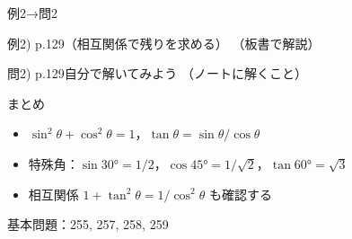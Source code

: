 \documentclass[aspectratio=43,professionalfonts,handout]{beamer}
\begin{document}
\begin{frame}{例2→問2}
  \begin{exampleblock}{例2) p.129（相互関係で残りを求める）}
    （板書で解説）
  \end{exampleblock}

  \vfill

  \begin{block}{問2) p.129\quad 自分で解いてみよう}
    （ノートに解くこと）
  \end{block}
\end{frame}

\begin{frame}{まとめ}
  \begin{itemize}
    \item $\sin^2\theta + \cos^2\theta = 1$，$\tan\theta = \sin\theta/\cos\theta$
    \item 特殊角：$\sin 30° = 1/2$，$\cos 45° = 1/\sqrt{2}$，$\tan 60° = \sqrt{3}$
    \item 相互関係 $1 + \tan^2\theta = 1/\cos^2\theta$ も確認する
  \end{itemize}

  \vfill
  {\small 基本問題：255, 257, 258, 259}
\end{frame}
\end{document}
